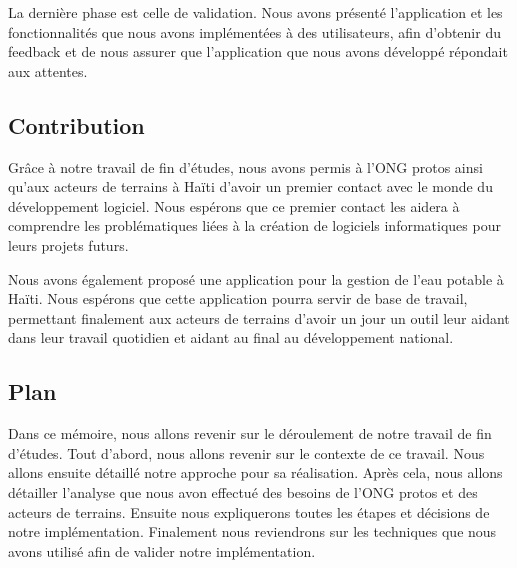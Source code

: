 \documentclass{eplmastersthesis_FR}
\begin{document}
			La dernière phase est celle de validation. Nous avons présenté l'application et les fonctionnalités que nous avons implémentées à des utilisateurs, afin d'obtenir du feedback et de nous assurer que l'application que nous avons développé répondait aux attentes.


		\subsection*{Contribution}

			Grâce à notre travail de fin d'études, nous avons permis à l'ONG protos ainsi qu'aux acteurs de terrains à Haïti d'avoir un premier contact avec le monde du développement logiciel. Nous espérons que ce premier contact les aidera à comprendre les problématiques liées à la création de logiciels informatiques pour leurs projets futurs.

			Nous avons également proposé une application pour la gestion de l'eau potable à Haïti. Nous espérons que cette application pourra servir de base de travail, permettant finalement aux acteurs de terrains d'avoir un jour un outil leur aidant dans leur travail quotidien et aidant au final au développement national.


		\subsection*{Plan}

			Dans ce mémoire, nous allons revenir sur le déroulement de notre travail de fin d'études. Tout d'abord, nous allons revenir sur le contexte de ce travail. Nous allons ensuite détaillé notre approche pour sa réalisation. Après cela, nous allons détailler l'analyse que nous avon effectué des besoins de l'ONG protos et des acteurs de terrains. Ensuite nous expliquerons toutes les étapes et décisions de notre implémentation. Finalement nous reviendrons sur les techniques que nous avons utilisé afin de valider notre implémentation.
\end{document}
